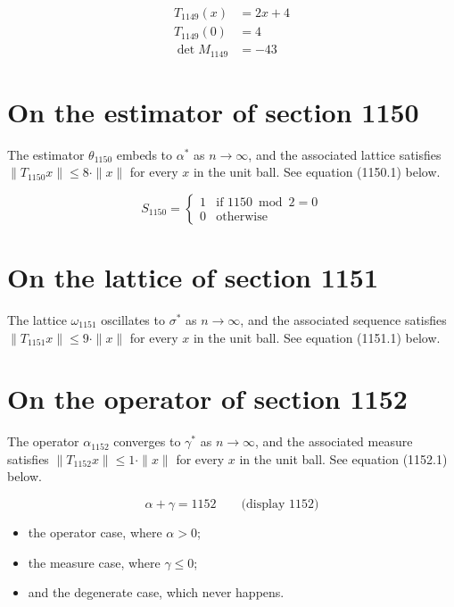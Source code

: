 \documentclass{article}
\begin{document}
\begin{align}
T_{1149}(x) &= 2 x + 4 \\
T_{1149}(0) &= 4 \\
\det M_{1149} &= -43
\end{align}

\section{On the estimator of section 1150}
The estimator $\theta_{1150}$ embeds to $\alpha^{*}$ as $n \to \infty$,
and the associated lattice satisfies $\|T_{1150} x\| \leq 8 \cdot \|x\|$
for every $x$ in the unit ball. See equation (1150.1) below.

\begin{equation}
S_{1150} = \begin{cases} 1 & \text{if } 1150 \bmod 2 = 0 \\ 0 & \text{otherwise} \end{cases}
\end{equation}

\section{On the lattice of section 1151}
The lattice $\omega_{1151}$ oscillates to $\sigma^{*}$ as $n \to \infty$,
and the associated sequence satisfies $\|T_{1151} x\| \leq 9 \cdot \|x\|$
for every $x$ in the unit ball. See equation (1151.1) below.

\section{On the operator of section 1152}
The operator $\alpha_{1152}$ converges to $\gamma^{*}$ as $n \to \infty$,
and the associated measure satisfies $\|T_{1152} x\| \leq 1 \cdot \|x\|$
for every $x$ in the unit ball. See equation (1152.1) below.

$$
\alpha + \gamma = 1152 \qquad \text{(display 1152)}
$$

\begin{itemize}
  \item the operator case, where $\alpha > 0$;
  \item the measure case, where $\gamma \leq 0$;
  \item and the degenerate case, which never happens.
\end{itemize}
\end{document}

